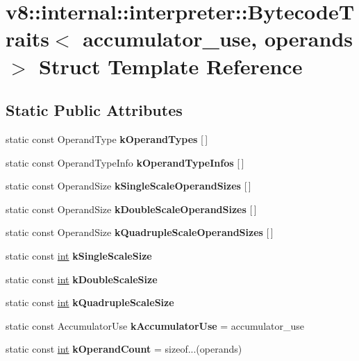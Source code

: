 \hypertarget{structv8_1_1internal_1_1interpreter_1_1BytecodeTraits}{}\section{v8\+:\+:internal\+:\+:interpreter\+:\+:Bytecode\+Traits$<$ accumulator\+\_\+use, operands $>$ Struct Template Reference}
\label{structv8_1_1internal_1_1interpreter_1_1BytecodeTraits}
\subsection*{Static Public Attributes}
\begin{DoxyCompactItemize}
\item 
static const Operand\+Type {\bfseries k\+Operand\+Types} \mbox{[}$\,$\mbox{]}
\item 
static const Operand\+Type\+Info {\bfseries k\+Operand\+Type\+Infos} \mbox{[}$\,$\mbox{]}
\item 
static const Operand\+Size {\bfseries k\+Single\+Scale\+Operand\+Sizes} \mbox{[}$\,$\mbox{]}
\item 
static const Operand\+Size {\bfseries k\+Double\+Scale\+Operand\+Sizes} \mbox{[}$\,$\mbox{]}
\item 
static const Operand\+Size {\bfseries k\+Quadruple\+Scale\+Operand\+Sizes} \mbox{[}$\,$\mbox{]}
\item 
static const \mbox{\hyperlink{classint}{int}} {\bfseries k\+Single\+Scale\+Size}
\item 
static const \mbox{\hyperlink{classint}{int}} {\bfseries k\+Double\+Scale\+Size}
\item 
static const \mbox{\hyperlink{classint}{int}} {\bfseries k\+Quadruple\+Scale\+Size}
\item 
\mbox{\label{structv8_1_1internal_1_1interpreter_1_1BytecodeTraits_acdcd362cba965b4cff5bddcb8b1a84e7}} 
static const Accumulator\+Use {\bfseries k\+Accumulator\+Use} = accumulator\+\_\+use
\item 
\mbox{\label{structv8_1_1internal_1_1interpreter_1_1BytecodeTraits_afdaa3de1b46f8108a160e636c25a0b4e}} 
static const \mbox{\hyperlink{classint}{int}} {\bfseries k\+Operand\+Count} = sizeof...(operands)
\end{DoxyCompactItemize}


